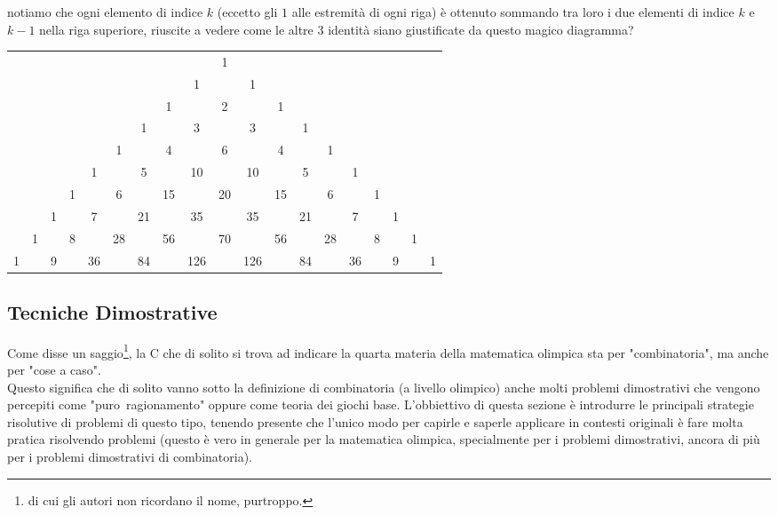 \documentclass[11pt]{scrartcl}
\begin{document}
	notiamo che ogni elemento di indice $k$ (eccetto gli $1$ alle estremità di ogni riga) è ottenuto sommando tra loro i due elementi di indice $k$ e $k-1$ nella riga superiore, riuscite a vedere come le altre $3$ identità siano giustificate da questo magico diagramma?
	\begin{center}
		\setlength{\tabcolsep}{5pt}
		\begin{tabular}{ccccccccccccccccccc}
			  &  &  &  &  &  &  &  &   &1 &   &  &  &  &  &  &  &  &  \\
			  &  &  &  &  &  &  &  &1  &  &1  &  &  &  &  &  &  &  &  \\
			  &  &  &  &  &  &  &1 &   &2 &   &1 &  &  &  &  &  &  &  \\
			  &  &  &  &  &  &1 &  &3  &  &3  &  &1 &  &  &  &  &  &  \\
			  &  &  &  &  &1 &  &4 &   &6 &   &4 &  &1 &  &  &  &  &  \\
			  &  &  &  &1 &  &5 &  &10 &  &10 &  &5 &  &1 &  &  &  &  \\
			  &  &  &1 &  &6 &  &15&   &20&   &15&  &6 &  &1 &  &  &  \\
			  &  &1 &  &7 &  &21&  &35 &  &35 &  &21&  &7 &  &1 &  &  \\
			  &1 &  &8 &  &28&  &56&   &70&   &56&  &28&  &8 &  &1 &  \\
			 1&  &9 &  &36&  &84&  &126&  &126&  &84&  &36&  &9 &  &1 \\
		\end{tabular}
	\end{center}

	\newpage
	
	\subsection{Tecniche Dimostrative}
	Come disse un saggio\footnote{di cui gli autori non ricordano il nome, purtroppo.}, la C che di solito si trova ad indicare la quarta materia della matematica olimpica sta per "combinatoria", ma anche per "cose a caso". \\
	Questo significa che di solito vanno sotto la definizione di combinatoria (a livello olimpico) anche molti problemi dimostrativi che vengono percepiti come \mbox{"puro ragionamento"} oppure come teoria dei giochi base. L'obbiettivo di questa sezione è introdurre le principali strategie risolutive di problemi di questo tipo, tenendo presente che l'unico modo per capirle e saperle applicare in contesti originali è fare molta pratica risolvendo problemi (questo è vero in generale per la matematica olimpica, specialmente per i problemi dimostrativi, ancora di più per i problemi dimostrativi di combinatoria).
	
\end{document}
